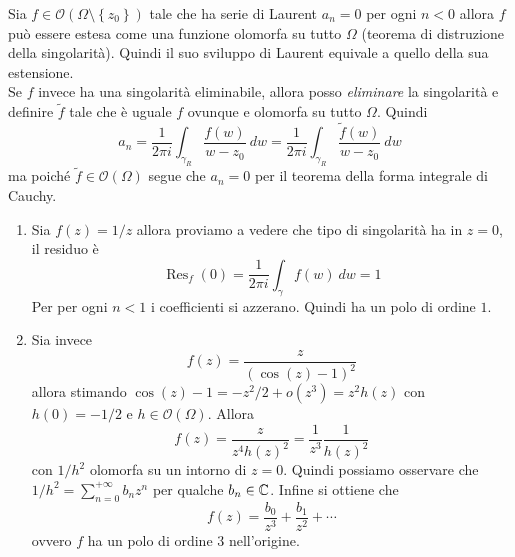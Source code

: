 \begin{remark}
  Sia $f \in \mathcal{O}(\Omega \setminus \left\{ z_0 \right\})$ tale che ha serie di 
  Laurent $a_n = 0$ per ogni $n < 0$  allora $f$ può essere estesa come una 
  funzione olomorfa su tutto $\Omega$ (teorema di distruzione della singolarità).
  Quindi il suo sviluppo di Laurent equivale a quello della sua estensione.\\
  
  Se $f$ invece ha una singolarità eliminabile, allora posso \emph{eliminare} la
  singolarità e definire $\tilde{f}$ tale che è uguale $f$ ovunque e olomorfa su
  tutto $\Omega$. Quindi 
  \begin{equation*}
    a_n = \frac{1}{2\pi i} \int_{\gamma_R} \frac{f(w)}{w-z_0}\ dw 
        = \frac{1}{2\pi i} \int_{\gamma_R} \frac{\tilde{f}(w)}{w-z_0}\ dw
  \end{equation*}
  ma poiché $\tilde{f} \in \mathcal{O}(\Omega)$ segue che $a_n = 0$ per il teorema
  della forma integrale di Cauchy.
  \label{rmk:equivalenza_definizioni_sing_eliminabili}
\end{remark}

\begin{example}
  \begin{enumerate}
    \item Sia $f(z) = 1/z$ allora proviamo a vedere che tipo di singolarità ha
      in $z = 0$, il residuo è 
      \begin{equation*}
        \operatorname{Res}_f(0) = \frac{1}{2\pi i } \int_{\gamma} f(w)\ dw = 1
      \end{equation*}
      Per per ogni $n < 1$ i coefficienti si azzerano. Quindi ha un polo di ordine
      $1$.
    \item Sia invece 
      \begin{equation*}
        f(z) = \frac{z}{(\cos(z) - 1)^2}
      \end{equation*}
      allora stimando $\cos(z) - 1 = -z^2/2 + o(z^3) = z^2 h(z)$ con $h(0)
      = -1/2$ e $h \in \mathcal{O}(\Omega)$. Allora 
      \begin{equation*}
        f(z) = \frac{z}{z^4h(z)^2} = \frac{1}{z^3} \frac{1}{h(z)^2}
      \end{equation*} 
      con $1/h^2$ olomorfa su un intorno di $z = 0$. Quindi possiamo osservare
      che $1/h^2 = \sum_{n=0}^{+\infty} b_n z^n$ per qualche $b_n \in \mathbb{C}$.
      Infine si ottiene che 
      \begin{equation*}
        f(z) = \frac{b_0}{z^3} + \frac{b_1}{z^2} + \cdots
      \end{equation*}
      ovvero $f$ ha un polo di ordine $3$ nell'origine.
  \end{enumerate}
\end{example}

